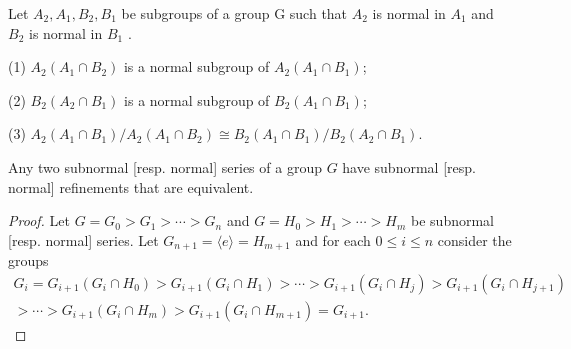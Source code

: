 \begin{lemma}[Zassenhaus]
    Let $A_2, A_1, B_2, B_1$ be subgroups of a group G such that $A_2$ is normal in $A_1$ and $B_2$ is normal in $B_1$ .

    (1) $A_2\left(A_1 \cap B_2\right)$ is a normal subgroup of $A_2(A_1 \cap B_1)$;

    (2) $B_2\left(A_2 \cap B_1\right)$ is a normal subgroup of $B_2(A_1 \cap B_1)$;

    (3) $A_2(A_1 \cap B_1) / A_2\left(A_1 \cap B_2\right) \cong B_2(A_1 \cap B_1) / B_2(A_2 \cap B_1)$.
\end{lemma}
\begin{theorem}[Schreier]
    Any two subnormal [resp. normal] series of a group $G$ have subnormal [resp. normal] refinements that are equivalent.
    \begin{proof}
        Let $G=G_0>G_1>\cdots>G_n$ and $G=H_0>H_1>\cdots>H_m$ be subnormal [resp. normal] series. Let $G_{n+1}=\langle e\rangle=H_{m+1}$ and for each $0 \leq i \leq n$ consider the groups
        \begin{equation*}
            \begin{gathered}
                G_i=G_{i+1}\left(G_i \cap H_0\right)>G_{i+1}\left(G_i \cap H_1\right)>\cdots>G_{i+1}\left(G_i \cap H_j\right)>G_{i+1}\left(G_i \cap H_{j+1}\right) \\
                >\cdots>G_{i+1}\left(G_i \cap H_m\right)>G_{i+1}\left(G_i \cap H_{m+1}\right)=G_{i+1} .
            \end{gathered}
        \end{equation*}


\end{proof}
\end{theorem}
